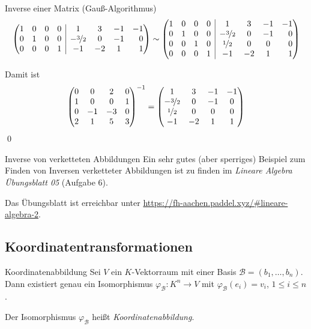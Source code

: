 \documentclass[german]{../spicker}
\makeatletter
\newcommand{\vektor}[1]{\begin{pmatrix*}[c] #1 \end{pmatrix*}}
\newenvironment{sysmatrix}[1]
 {\left(\begin{array}{@{}#1@{}}}
 {\end{array}\right)}
\makeatother
\begin{document}
\begin{example}{Inverse einer Matrix (Gauß-Algorithmus)}
$$\begin{sysmatrix}{cccr|cccr}
            1 & 0 & 0 & 0   & 1 & 3 & -1 & -1 \\
            0 & 1 & 0 & 0 & -\nicefrac{3}{2} & 0 & -1 & 0 \\
            0 & 0 & 0 & 1   & -1 & -2 & 1 & 1
        \end{sysmatrix}
        \sim
        \begin{sysmatrix}{cccr|cccr}
            1 & 0 & 0 & 0   & 1 & 3 & -1 & -1 \\
            0 & 1 & 0 & 0 & -\nicefrac{3}{2} & 0 & -1 & 0 \\
            0 & 0 & 1 & 0   & \nicefrac{1}{2} & 0 & 0 & 0 \\
            0 & 0 & 0 & 1   & -1 & -2 & 1 & 1
        \end{sysmatrix}
    $$

    Damit ist
    $$
        \vektor{0 & 0 & 2 & 0 \\ 1 & 0 & 0 & 1 \\ 0 & -1 & -3 & 0 \\ 2 & 1 & 5 & 3}^{-1} = \vektor{1 & 3 & -1 & -1 \\-\nicefrac{3}{2} & 0 & -1 & 0 \\ \nicefrac{1}{2} & 0 & 0 & 0 \\ -1 & -2 & 1 & 1}
    $$\qed
\end{example}

\begin{example}{Inverse von verketteten Abbildungen}
    Ein sehr gutes (aber sperriges) Beispiel zum Finden von Inversen verketteter Abbildungen ist zu finden im \emph{Lineare Algebra Übungsblatt 05} (Aufgabe 6).

    Das Übungsblatt ist erreichbar unter \url{https://fh-aachen.paddel.xyz/#lineare-algebra-2}.
\end{example}

\subsection{Koordinatentransformationen}

\begin{defi}{Koordinatenabbildung}
    Sei $V$ ein $K$-Vektorraum mit einer Basis $\mathcal{B} = (b_1, \ldots, b_n)$.
    Dann existiert genau ein Isomorphismus $\varphi_{\mathcal{B}} : K^n \to V$ mit $\varphi_{\mathcal{B}}(e_i) = v_i$, $1 \leq i \leq n$.

    Der Isomorphismus $\varphi_{\mathcal{B}}$ heißt \emph{Koordinatenabbildung}.
\end{defi}
\end{document}
